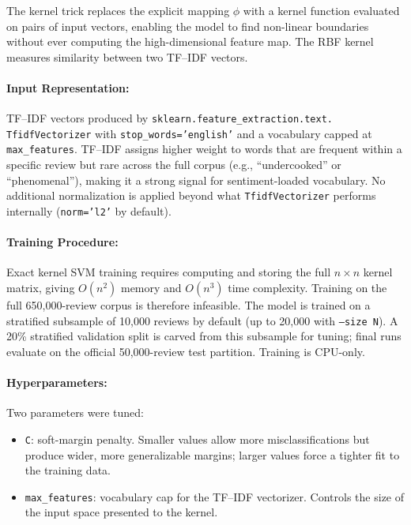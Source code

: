 \documentclass[12pt]{article}
\begin{document}
The kernel trick replaces the explicit mapping $\phi$ with a kernel function evaluated on pairs of input vectors, enabling the model to find non-linear boundaries without ever computing the high-dimensional feature map. The RBF kernel measures similarity between two TF--IDF vectors.

\paragraph{Input Representation:}
TF--IDF vectors produced by \texttt{sklearn.feature\_extraction.text. TfidfVectorizer} with \texttt{stop\_words='english'} and a vocabulary capped at \texttt{max\_features}. TF--IDF assigns higher weight to words that are frequent within a specific review but rare across the full corpus (e.g., ``undercooked'' or ``phenomenal''), making it a strong signal for sentiment-loaded vocabulary. No additional normalization is applied beyond what \texttt{TfidfVectorizer} performs internally (\texttt{norm='l2'} by default).
 
\paragraph{Training Procedure:}
Exact kernel SVM training requires computing and storing the full $n\times n$ kernel matrix, giving $O(n^2)$ memory and $O(n^3)$ time complexity. Training on the full 650,000-review corpus is therefore infeasible. The model is trained on a stratified subsample of 10,000 reviews by default (up to 20,000 with \texttt{--size N}). A 20\% stratified validation split is carved from this subsample for tuning; final runs evaluate on the official 50,000-review test partition. Training is CPU-only.
 
\paragraph{Hyperparameters:}
Two parameters were tuned:
\begin{itemize}
    \item \texttt{C}: soft-margin penalty. Smaller values allow more misclassifications but produce wider, more generalizable margins; larger values force a tighter fit to the training data.
    \item \texttt{max\_features}: vocabulary cap for the TF--IDF vectorizer. Controls the size of the input space presented to the kernel.
\end{itemize}
 
\end{document}
